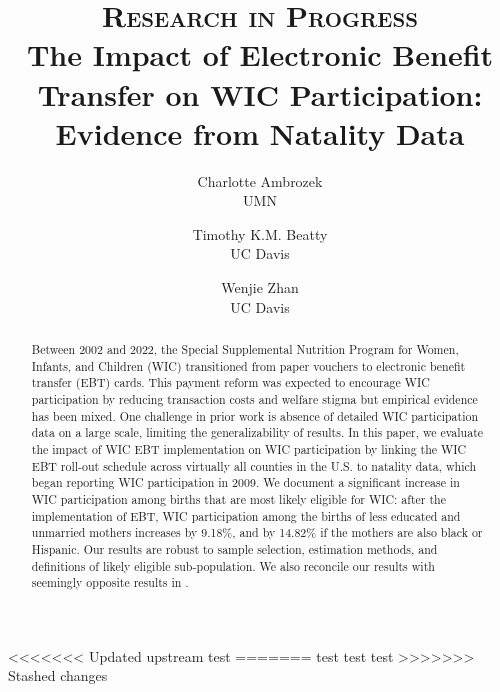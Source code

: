 \documentclass[a4paper,twoside,11pt]{article}
\begin{document}
\title{\vspace{0.8\baselineskip} 
\textsc{Research in Progress} \\ The Impact of Electronic Benefit Transfer on WIC Participation: Evidence from Natality Data}
\author{Charlotte Ambrozek \\ UMN \and Timothy K.M. Beatty \\ UC Davis \and Wenjie Zhan \\ UC Davis}
\maketitle

\begin{abstract}
Between 2002 and 2022, the Special Supplemental Nutrition Program for Women, Infants, and Children
(WIC) transitioned from paper vouchers to electronic benefit transfer (EBT) cards. This payment reform
was expected to encourage WIC participation by reducing transaction costs and welfare stigma but empirical evidence has been mixed. One challenge in prior work is absence of detailed WIC participation data on a large scale, limiting
the generalizability of results. In this paper, we evaluate the impact of WIC EBT implementation on WIC
participation by linking the WIC EBT roll-out schedule across virtually all counties in the U.S. to natality
data, which began reporting WIC participation in 2009. We document a significant increase in WIC participation among births that are most likely eligible for WIC: after the implementation of EBT, WIC participation among the births of less educated and unmarried mothers increases by 9.18\%, and by 14.82\% if the mothers are also black or Hispanic. Our results are robust to sample selection, estimation methods, and definitions of likely eligible sub-population. We also reconcile our results with seemingly opposite results in \cite{meckel2020cure}.
\end{abstract}

\clearpage








<<<<<<< Updated upstream
test
=======
test test test
>>>>>>> Stashed changes

\clearpage

\begin{spacing}{1.25}
\newpage


\end{spacing}
\end{document}
